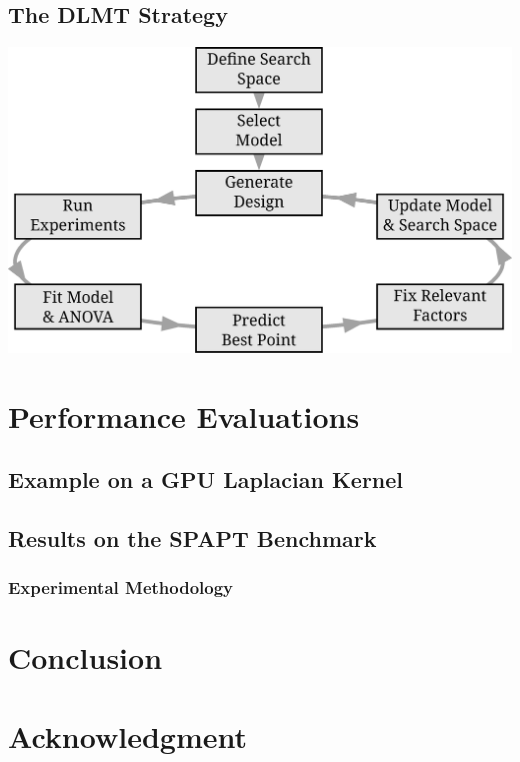\documentclass[conference]{IEEEtran}
\begin{document}
\subsection{The DLMT Strategy}
\label{sec:org785af4e}
\begin{center}
\begin{center}
\includegraphics[width=.8\columnwidth]{./img/doe_anova_strategy.eps}
\end{center}
\end{center}

\section{Performance Evaluations}
\label{sec:orgc411c73}
\subsection{Example on a GPU Laplacian Kernel}
\label{sec:orgb9bc63d}
\subsection{Results on the SPAPT Benchmark}
\label{sec:org5841547}
\subsubsection{Experimental Methodology}
\label{sec:org69c24ed}
\section{Conclusion}
\label{sec:org9c19ac4}
\section*{Acknowledgment}
\label{sec:orga848e60}


\end{document}

